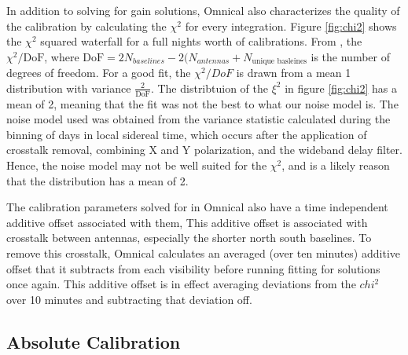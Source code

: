 \documentclass[twocolumn,numberedappendix]{emulateapj} \shorttitle{PSA64}
\begin{document}
In addition to solving for gain solutions, Omnical also characterizes the
quality of the calibration by calculating the $\chi^{2}$ for every integration.
Figure \ref{fig:chi2} shows the $\chi^{2}$ squared waterfall for a full
nights worth of calibrations. From \cite{zheng_et_al2014}, the
$\chi^{2}/\text{DoF}$, where $\text{DoF} = 2N_{baselines} - 2(N_{antennas} +
N_{\text{unique basleines}} $ is the number of degrees of freedom. For a good
fit, the $\chi^{2}/DoF$ is drawn from a mean 1 distribution with variance
$\frac{2}{\text{DoF}}$. The distribtuion of the $\xi^{2}$ in figure
\ref{fig:chi2} has a mean of 2, meaning that the fit was not the best to what
our noise model is.
The noise model used was obtained from the variance statistic calculated during
the binning of days in local sidereal time, which occurs after the
application of crosstalk removal, combining X and Y polarization, and the
wideband delay filter. Hence, the noise model may not be well suited for the
$\chi^{2}$, and is a likely reason that the distribution has a mean of 2.

The calibration parameters solved for in Omnical also have a time independent
additive offset associated with them, This additive offset is associated with
crosstalk between antennas, especially the shorter north south baselines.
To remove this crosstalk, Omnical calculates an averaged (over ten minutes)
additive offset that it subtracts from each visibility before running fitting
for solutions once again. This additive offset is in effect averaging deviations
from the $chi^{2}$ over 10 minutes and subtracting that deviation off.

\subsection{Absolute Calibration} 
%
\end{document}
